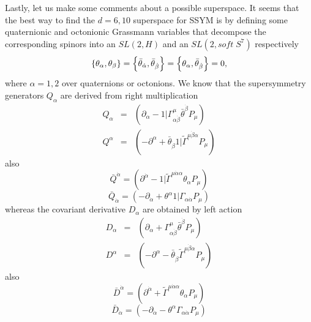 \documentclass[a4paper,12pt]{book}
\begin{document}
Lastly, let us make some comments about a possible superspace. It seems that
the best way to find the $d=6,10$ superspace for SSYM is by defining some
quaternionic and octonionic Grassmann variables that decompose the
corresponding spinors into an $SL\left( 2,H\right) $ and an $SL\left(
2,soft\;S^{7}\right) $ respectively 
\begin{equation}
\left\{ \theta _{\alpha },\theta _{\beta }\right\} =\left\{ \bar{\theta}_{%
\dot{\alpha}},\bar{\theta}_{\dot{\beta}}\right\} =\left\{ \theta _{\alpha },%
\bar{\theta}_{\dot{\beta}}\right\} =0,
\end{equation}
where $\alpha =1,2$ over quaternions or octonions. We know that the
supersymmetry generators $Q_{\alpha }$ are derived from right multiplication 
\begin{eqnarray}
{Q}_{\alpha } &=&\left( \partial _{\alpha }-1|\Gamma _{\alpha \dot{\beta}%
}^{\mu }\bar{\theta}^{\dot{\beta}}P_{\mu }\right)  \\
{Q}^{\alpha } &=&\left( -\partial ^{{\alpha }}+\bar{\theta}_{\dot{\beta}}1|%
\tilde{\Gamma}^{\mu \dot{\beta}\alpha }P_{\mu }\right) 
\end{eqnarray}
also 
\begin{equation}
{\bar{Q}}^{\dot{\alpha}}=\left( \partial ^{\dot{\alpha}}-1|\tilde{\Gamma}%
^{\mu \dot{\alpha}\alpha }\theta _{\alpha }P_{\mu }\right) 
\end{equation}
\begin{equation}
{\bar{Q}}_{\dot{\alpha}}=\left( -\partial _{\dot{\alpha}}+\theta ^{\alpha
}1|\Gamma _{\alpha \dot{\alpha}}P_{\mu }\right) 
\end{equation}
whereas the covariant derivative $D_{\alpha }$ are obtained by left action 
\begin{eqnarray}
{D}_{\alpha } &=&\left( \partial _{\alpha }+\Gamma _{\alpha \dot{\beta}%
}^{\mu }\bar{\theta}^{\dot{\beta}}P_{\mu }\right)  \\
{D}^{\alpha } &=&\left( -\partial ^{{\alpha }}-\bar{\theta}_{\dot{\beta}}%
\tilde{\Gamma}^{\mu \dot{\beta}\alpha }P_{\mu }\right) 
\end{eqnarray}
also 
\begin{equation}
{\bar{D}}^{\dot{\alpha}}=\left( \partial ^{\dot{\alpha}}+\tilde{\Gamma}^{\mu 
\dot{\alpha}\alpha }\theta _{\alpha }P_{\mu }\right) 
\end{equation}
\begin{equation}
{\bar{D}}_{\dot{\alpha}}=\left( -\partial _{\dot{\alpha}}-\theta ^{\alpha
}\Gamma _{\alpha \dot{\alpha}}P_{\mu }\right) 
\end{equation}
\end{document}
